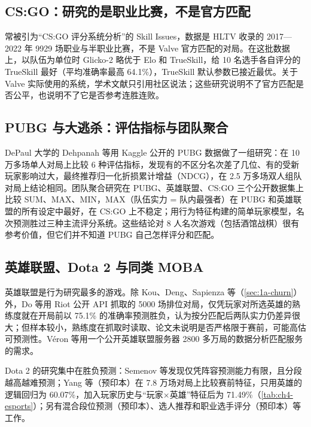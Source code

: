 \subsection{CS:GO：研究的是职业比赛，不是官方匹配}\label{sec:1a-games-cs}

常被引为“CS:GO 评分系统分析”的 Skill Issues，数据是 HLTV 收录的 2017—2022 年 9929 场职业与半职业比赛，不是 Valve 官方匹配的对局\cite{bober2024skill}\tagLit。在这批数据上，以队伍为单位时 Glicko-2 略优于 Elo 和 TrueSkill，给 10 名选手各自评分的 TrueSkill 最好（平均准确率最高 64.1\%），TrueSkill 默认参数已接近最优。关于 Valve 实际使用的系统，学术文献只引用社区说法；这些研究说明不了官方匹配是否公平，也说明不了它是否参考连胜连败。

\subsection{PUBG 与大逃杀：评估指标与团队聚合}\label{sec:1a-games-br}

DePaul 大学的 Dehpanah 等用 Kaggle 公开的 PUBG 数据做了一组研究：在 10 万多场单人对局上比较 6 种评估指标，发现有的不区分名次差了几位、有的受新玩家影响过大，最终推荐归一化折损累计增益（NDCG）\cite{dehpanah2020evaluation}\tagLit，在 2.5 万多场双人组队对局上结论相同\cite{dehpanah2021evaluation}\tagLit。团队聚合研究在 PUBG、英雄联盟、CS:GO 三个公开数据集上比较 SUM、MAX、MIN，MAX（队伍实力 = 队内最强者）在 PUBG 和英雄联盟的所有设定中最好，在 CS:GO 上不稳定\cite{dehpanah2021evaluating}\tagLit；用行为特征构建的简单玩家模型，名次预测胜过三种主流评分系统\cite{dehpanah2021player}\tagLit。这些结论对 8 人名次游戏（包括酒馆战棋）很有参考价值，但它们并不知道 PUBG 自己怎样评分和匹配。

\subsection{英雄联盟、Dota 2 与同类 MOBA}\label{sec:1a-games-lol}

英雄联盟是行为研究最多的游戏。除 Kou、Deng、Sapienza 等（\cref{sec:1a-churn}）外，Do 等用 Riot 公开 API 抓取的 5000 场排位对局，仅凭玩家对所选英雄的熟练度就在开局前以 75.1\% 的准确率预测胜负，认为按分匹配后两队实力仍差异很大\cite{do2021using}\tagLit；但样本较小，熟练度在抓取时读取、论文未说明是否严格限于赛前，可能高估可预测性\tagOwn。Véron 等用一个公开英雄联盟服务器 2800 多万局的数据分析匹配服务的需求\cite{veron2014matchmaking}\tagLit{}。

Dota 2 的研究集中在胜负预测：Semenov 等发现仅凭阵容预测能力有限，且分段越高越难预测\cite{semenov2017performance}\tagLit\needcheck[；具体数值来自作者报告幻灯片的二手转述]；Yang 等（预印本）在 7.8 万场对局上比较赛前特征，只用英雄的逻辑回归为 60.07\%，加入玩家历史与“玩家×英雄”特征后为 71.49\%\cite{yang2017realtime}\tagLit（\cref{tab:ch4-esports}）；另有混合段位预测（预印本）\cite{hodge2017win}\tagLit{}、选人推荐\cite{lee2022draftrec}\tagLit{}和职业选手评分（预印本）\cite{debois2025pandaskill}\tagLit{}等工作。

